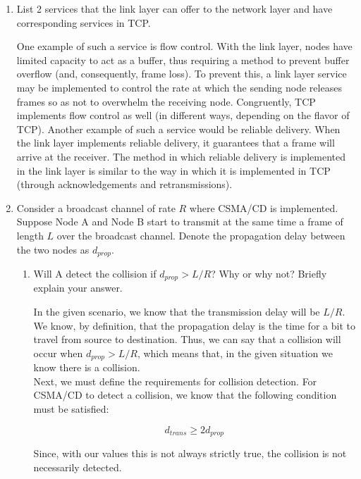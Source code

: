 \begin{enumerate}

    \item List 2 services that the link layer can offer to the network layer and have corresponding services in TCP.

      One example of such a service is flow control. With the link layer, nodes have limited capacity to act as a buffer, thus requiring a method to prevent buffer overflow (and, consequently, frame loss). To prevent this, a link layer service may be implemented to control the rate at which the sending node releases frames so as not to overwhelm the receiving node. Congruently, TCP implements flow control as well (in different ways, depending on the flavor of TCP). Another example of such a service would be reliable delivery. When the link layer implements reliable delivery, it guarantees that a frame will arrive at the receiver. The method in which reliable delivery is implemented in the link layer is similar to the way in which it is implemented in TCP (through acknowledgements and retransmissions).

    \item Consider a broadcast channel of rate $R$ where CSMA/CD is implemented. Suppose Node A and Node B start to transmit at the same time a frame of length $L$ over the broadcast channel. Denote the propagation delay between the two nodes as $d_{prop}$.

      \begin{enumerate}

        \item Will A detect the collision if $d_{prop}>L/R$? Why or why not? Briefly explain your answer.

          In the given scenario, we know that the transmission delay will be $L/R$. We know, by definition, that the propagation delay is the time for a bit to travel from source to destination. Thus, we can say that a collision will occur when $d_{prop}>L/R$, which means that, in the given situation we know there is a collision.\\

          Next, we must define the requirements for collision detection. For CSMA/CD to detect a collision, we know that the following condition must be satisfied:

          $$d_{trans}\geq 2d_{prop}$$

          Since, with our values this is not always strictly true, the collision is not necessarily detected.


\end{enumerate}
\end{enumerate}
